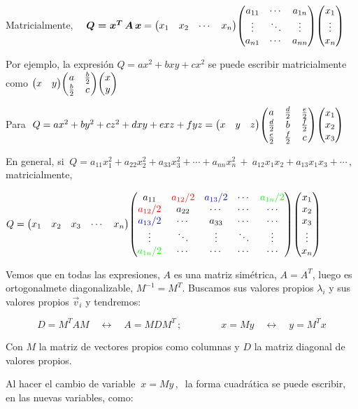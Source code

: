 Matricialmente, $ \quad \boldsymbol{Q=x^T\, A\, x} = 
\mqty(x_1&x_2&\cdots &x_n) \mqty( a_{11} & \cdots  & a_{1n} \\ \vdots & \ddots & \vdots \\ a_{n1} & \cdots  & a_{nn}) \mqty(x_1\\ \vdots \\ x_n)$


Por ejemplo, la expresión $Q=ax^2+bxy+cx^2$ se puede escribir matricialmente como $\mqty(x&y) \mqty(a&\frac b 2 \\ \frac b 2 & c) \mqty(x\\y)$

Para $\ Q=ax^2+by^2+cz^2+dxy+exz+fyz=\mqty(x&y&z)\mqty(a&\frac d 2 & \frac e 2 \\ \frac d 2 & b & \frac f 2 \\ \frac e 2 & \frac f 2 & c) \mqty(x_1\\x_2\\x_3)$

En general, si $\ Q=a_{11}x_1^2+a_{22}x_2^2+a_{33}x_3^2+\cdots +a_{nn}x_n^2 \, + \  a_{12}x_1x_2+a_{13}x_1x_3+ \cdots \, , \ $ matricialmente, 

$Q=\mqty(x_1&x_2&x_3&\cdots &x_n) 
\mqty(
a_{11}& \textcolor{red}{a_{12}/2} & \textcolor{blue}{a_{13}/2} & \cdots & \textcolor{green}{a_{1n}/2} \\
\textcolor{red}{a_{12}/2}& a_{22} & \cdots & \cdots & \cdots \\
\textcolor{blue}{a_{13}/2}& \cdots & a_{33} & \cdots & \cdots \\
\vdots & \ddots & \vdots & \ddots & \vdots \\
\textcolor{green}{a_{1n}/2} & \cdots & \cdots & \cdots & \cdots  )
\mqty(x_1\\x_2\\x_3\\ \vdots \\ x_n)$


Vemos que en todas las expresiones, $A$ es una matriz simétrica, $A=A^T$, luego es ortogonalmete diagonalizable, $M^{-1}=M^T$. Buscamos sus valores propios $\lambda_i$ y sus valores propios $\vec v_i$ y tendremos:

$$D=M^TAM \quad \leftrightarrow \quad A=MDM^T\, ; \qquad \qquad x=My \quad \leftrightarrow \quad y=M^Tx$$

Con $M$ la matriz de vectores propios como columnas y $D$ la matriz diagonal de valores propios.

Al hacer el cambio de variable $\ x=My\, , \ $ la forma cuadrática se puede escribir, en las nuevas variables,  como:

